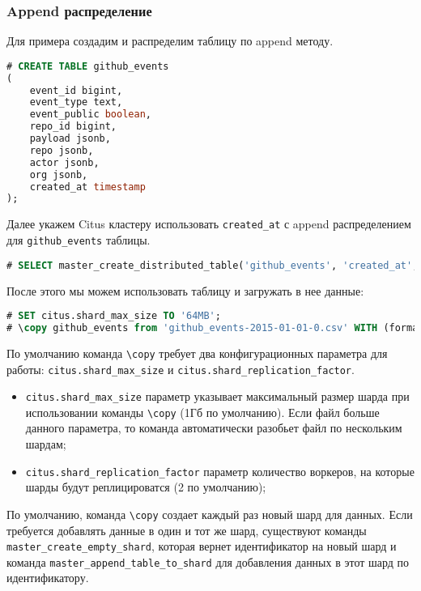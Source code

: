 \subsubsection{Append распределение}

Для примера создадим и распределим таблицу по append методу.

\begin{lstlisting}[language=SQL,label=lst:citus_append1,caption=Создание таблицы]
# CREATE TABLE github_events
(
    event_id bigint,
    event_type text,
    event_public boolean,
    repo_id bigint,
    payload jsonb,
    repo jsonb,
    actor jsonb,
    org jsonb,
    created_at timestamp
);
\end{lstlisting}

Далее укажем Citus кластеру использовать \lstinline!created_at! с append распределением для \lstinline!github_events! таблицы.

\begin{lstlisting}[language=SQL,label=lst:citus_append2,caption=Создание hash распределения]
# SELECT master_create_distributed_table('github_events', 'created_at', 'append');
\end{lstlisting}

После этого мы можем использовать таблицу и загружать в нее данные:

\begin{lstlisting}[language=SQL,label=lst:citus_append3,caption=Загрузка данных]
# SET citus.shard_max_size TO '64MB';
# \copy github_events from 'github_events-2015-01-01-0.csv' WITH (format CSV)
\end{lstlisting}

По умолчанию команда \lstinline!\copy! требует два конфигурационных параметра для работы: \lstinline!citus.shard_max_size! и \lstinline!citus.shard_replication_factor!.

\begin{itemize}
  \item \lstinline!citus.shard_max_size! параметр указывает максимальный размер шарда при использовании команды \lstinline!\copy! (1Гб по умолчанию). Если файл больше данного параметра, то команда автоматически разобьет файл по нескольким шардам;
  \item \lstinline!citus.shard_replication_factor! параметр количество воркеров, на которые шарды будут реплицироватся (2 по умолчанию);
\end{itemize}

По умолчанию, команда \lstinline!\copy! создает каждый раз новый шард для данных. Если требуется добавлять данные в один и тот же шард, существуют команды \lstinline!master_create_empty_shard!, которая вернет идентификатор на новый шард и команда \lstinline!master_append_table_to_shard! для добавления данных в этот шард по идентификатору.

